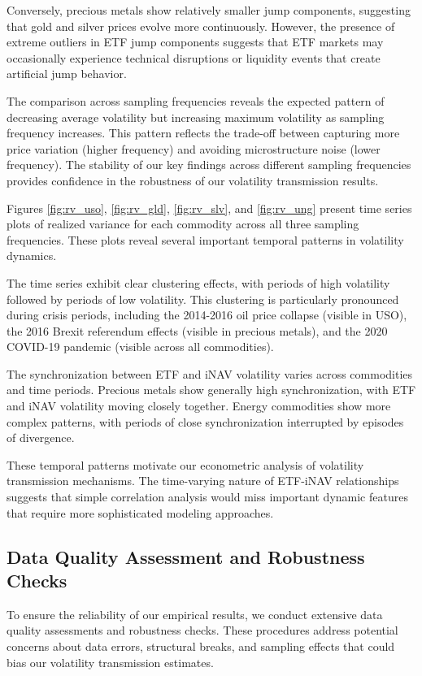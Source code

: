Conversely, precious metals show relatively smaller jump components, suggesting that gold and silver prices evolve more continuously. However, the presence of extreme outliers in ETF jump components suggests that ETF markets may occasionally experience technical disruptions or liquidity events that create artificial jump behavior.

The comparison across sampling frequencies reveals the expected pattern of decreasing average volatility but increasing maximum volatility as sampling frequency increases. This pattern reflects the trade-off between capturing more price variation (higher frequency) and avoiding microstructure noise (lower frequency). The stability of our key findings across different sampling frequencies provides confidence in the robustness of our volatility transmission results.

Figures \ref{fig:rv_uso}, \ref{fig:rv_gld}, \ref{fig:rv_slv}, and \ref{fig:rv_ung} present time series plots of realized variance for each commodity across all three sampling frequencies. These plots reveal several important temporal patterns in volatility dynamics.

The time series exhibit clear clustering effects, with periods of high volatility followed by periods of low volatility. This clustering is particularly pronounced during crisis periods, including the 2014-2016 oil price collapse (visible in USO), the 2016 Brexit referendum effects (visible in precious metals), and the 2020 COVID-19 pandemic (visible across all commodities).

The synchronization between ETF and iNAV volatility varies across commodities and time periods. Precious metals show generally high synchronization, with ETF and iNAV volatility moving closely together. Energy commodities show more complex patterns, with periods of close synchronization interrupted by episodes of divergence.

These temporal patterns motivate our econometric analysis of volatility transmission mechanisms. The time-varying nature of ETF-iNAV relationships suggests that simple correlation analysis would miss important dynamic features that require more sophisticated modeling approaches.

\subsection{Data Quality Assessment and Robustness Checks}

To ensure the reliability of our empirical results, we conduct extensive data quality assessments and robustness checks. These procedures address potential concerns about data errors, structural breaks, and sampling effects that could bias our volatility transmission estimates.

